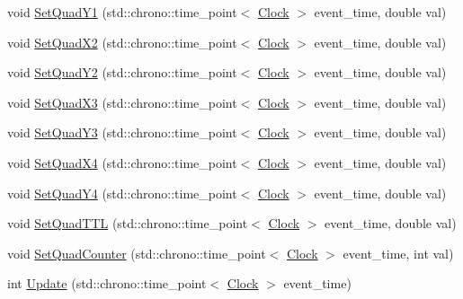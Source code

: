 \begin{DoxyCompactItemize}
\item 
void \mbox{\hyperlink{classQuad_a3f0f9162be2b1ec2e2597a163586fb01}{Set\+Quad\+Y1}} (std\+::chrono\+::time\+\_\+point$<$ \mbox{\hyperlink{universe_8h_a0ef8d951d1ca5ab3cfaf7ab4c7a6fd80}{Clock}} $>$ event\+\_\+time, double val)
\item 
void \mbox{\hyperlink{classQuad_af1df44b73207c3e70b794e889e5225af}{Set\+Quad\+X2}} (std\+::chrono\+::time\+\_\+point$<$ \mbox{\hyperlink{universe_8h_a0ef8d951d1ca5ab3cfaf7ab4c7a6fd80}{Clock}} $>$ event\+\_\+time, double val)
\item 
void \mbox{\hyperlink{classQuad_afcec579c40a3763c34d1ace417888bf9}{Set\+Quad\+Y2}} (std\+::chrono\+::time\+\_\+point$<$ \mbox{\hyperlink{universe_8h_a0ef8d951d1ca5ab3cfaf7ab4c7a6fd80}{Clock}} $>$ event\+\_\+time, double val)
\item 
void \mbox{\hyperlink{classQuad_a0cbdd18a95fe7240b09c40fcee29f5df}{Set\+Quad\+X3}} (std\+::chrono\+::time\+\_\+point$<$ \mbox{\hyperlink{universe_8h_a0ef8d951d1ca5ab3cfaf7ab4c7a6fd80}{Clock}} $>$ event\+\_\+time, double val)
\item 
void \mbox{\hyperlink{classQuad_a1774a89a5d668aadf94966867270c0c5}{Set\+Quad\+Y3}} (std\+::chrono\+::time\+\_\+point$<$ \mbox{\hyperlink{universe_8h_a0ef8d951d1ca5ab3cfaf7ab4c7a6fd80}{Clock}} $>$ event\+\_\+time, double val)
\item 
void \mbox{\hyperlink{classQuad_ac49d711fa31a12ba24ad65c959c74e05}{Set\+Quad\+X4}} (std\+::chrono\+::time\+\_\+point$<$ \mbox{\hyperlink{universe_8h_a0ef8d951d1ca5ab3cfaf7ab4c7a6fd80}{Clock}} $>$ event\+\_\+time, double val)
\item 
void \mbox{\hyperlink{classQuad_ae299f75dcd479f5eb6ba8efed578961b}{Set\+Quad\+Y4}} (std\+::chrono\+::time\+\_\+point$<$ \mbox{\hyperlink{universe_8h_a0ef8d951d1ca5ab3cfaf7ab4c7a6fd80}{Clock}} $>$ event\+\_\+time, double val)
\item 
void \mbox{\hyperlink{classQuad_a4d3a52272d572315198623e836ac0a97}{Set\+Quad\+T\+TL}} (std\+::chrono\+::time\+\_\+point$<$ \mbox{\hyperlink{universe_8h_a0ef8d951d1ca5ab3cfaf7ab4c7a6fd80}{Clock}} $>$ event\+\_\+time, double val)
\item 
void \mbox{\hyperlink{classQuad_a66ba58a32cf7b351e3e155efbdb46f8e}{Set\+Quad\+Counter}} (std\+::chrono\+::time\+\_\+point$<$ \mbox{\hyperlink{universe_8h_a0ef8d951d1ca5ab3cfaf7ab4c7a6fd80}{Clock}} $>$ event\+\_\+time, int val)
\item 
int \mbox{\hyperlink{classQuad_a0710e6a7d77a34fdadbd2c36d03ade62}{Update}} (std\+::chrono\+::time\+\_\+point$<$ \mbox{\hyperlink{universe_8h_a0ef8d951d1ca5ab3cfaf7ab4c7a6fd80}{Clock}} $>$ event\+\_\+time)
\end{DoxyCompactItemize}
